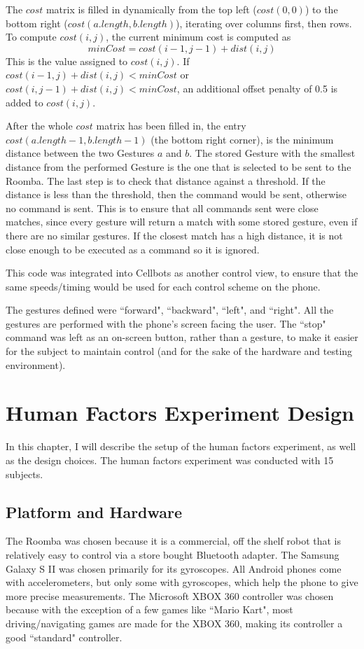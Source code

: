 \documentclass[12pt,a4paper]{report}
\begin{document}
The $cost$ matrix is filled in dynamically from the top left ($cost(0, 0)$) to the bottom right ($cost(a.length, b.length)$), iterating over columns first, then rows. To compute $cost(i, j)$, the current minimum cost is computed as \[minCost = cost(i - 1, j - 1) + dist(i, j)\] This is the value assigned to $cost(i, j)$. If $cost(i - 1, j) + dist(i, j) < minCost$ or $cost(i, j - 1) + dist(i, j) < minCost$, an additional offset penalty of 0.5 is added to $cost(i, j)$.

After the whole $cost$ matrix has been filled in, the entry $cost(a.length - 1, b.length - 1)$ (the bottom right corner), is the minimum distance between the two Gestures $a$ and $b$. The stored Gesture with the smallest distance from the performed Gesture is the one that is selected to be sent to the Roomba. The last step is to check that distance against a threshold. If the distance is less than the threshold, then the command would be sent, otherwise no command is sent. This is to ensure that all commands sent were close matches, since every gesture will return a match with some stored gesture, even if there are no similar gestures. If the closest match has a high distance, it is not close enough to be executed as a command so it is ignored.

This code was integrated into Cellbots as another control view, to ensure that the same speeds/timing would be used for each control scheme on the phone.

The gestures defined were ``forward", ``backward", ``left", and ``right". 
All the gestures are performed with the phone's screen facing the user. The ``stop" command was left as an on-screen button, rather than a gesture, to make it easier for the subject to maintain control (and for the sake of the hardware and testing environment).

\chapter{Human Factors Experiment Design}
In this chapter, I will describe the setup of the human factors experiment, as well as the design choices. The human factors experiment was conducted with 15 subjects.
\section{Platform and Hardware}
The Roomba was chosen because it is a commercial, off the shelf robot that is relatively easy to control via a store bought Bluetooth adapter. The Samsung Galaxy S II was chosen primarily for its gyroscopes. All Android phones come with accelerometers, but only some with gyroscopes, which help the phone to give more precise measurements. The Microsoft XBOX 360 controller was chosen because with the exception of a few games like ``Mario Kart", most driving/navigating games are made for the XBOX 360, making its controller a good ``standard" controller.
\end{document}
